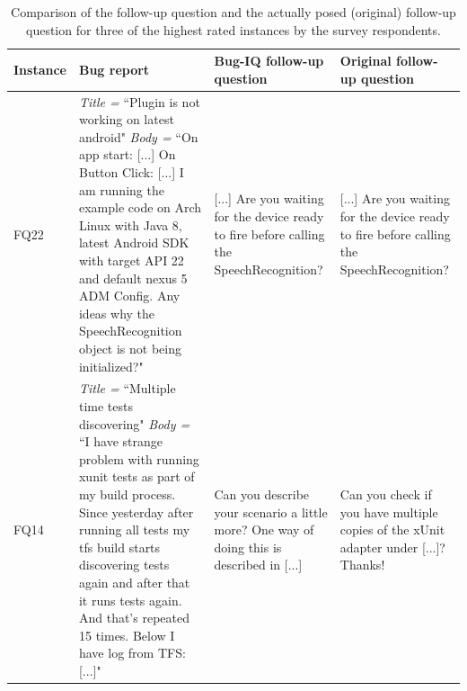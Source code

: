 \begin{table}[t]
	\centering
	\caption{Comparison of the \evpi follow-up question and the actually posed (original) follow-up question for three of the highest rated instances by the survey respondents.}
	\begin{tabular}{ |M{1cm}|p{7.3cm}|p{4cm}|p{4cm}|  }		\hline
		Instance &Bug report & Bug-IQ follow-up question & Original follow-up question\\		\hline

		FQ22
		&{\em Title =} ``Plugin is not working on latest android" \newline
		{\em Body =} ``On app start: [...] \newline
		On Button Click: [...] \newline
		I am running the example code on Arch Linux with Java 8, latest Android SDK with target API 22 and default nexus 5 ADM Config.
		Any ideas why the SpeechRecognition object is not being initialized?"
		& [...] Are you waiting for the device ready to fire before calling the SpeechRecognition?
		& [...] Are you waiting for the device ready to fire before calling the SpeechRecognition?\\ \hline

		FQ14
		&{\em Title =} ``Multiple time tests discovering" \newline
		{\em Body =} ``I have strange problem with running xunit tests as part of my build process. Since yesterday after running all tests my tfs build starts discovering tests again and after that it runs tests again. And that's repeated 15 times.
		Below I have log from TFS: [...]"
		& Can you describe your scenario a little more? One way of doing this is described in [...]
		& Can you check if you have multiple copies of the xUnit adapter under [...]? Thanks! \\ \hline
		

\end{tabular}
\end{table}
